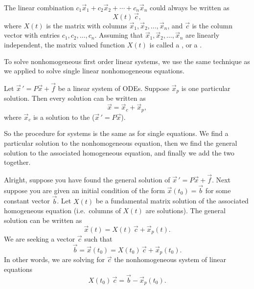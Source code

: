 \documentclass[12pt]{book}
\begin{document}
The linear combination $c_1 \vec{x}_1 + c_2 \vec{x}_2 + \cdots + c_n
\vec{x}_n$ could always be written as
\begin{equation*}
X(t)\,\vec{c} ,
\end{equation*}
where $X(t)$ is the matrix with columns $\vec{x}_1, \vec{x}_2, \ldots, \vec{x}_n$,
and $\vec{c}$ is the column vector with entries $c_1, c_2, \ldots, c_n$.
Assuming that $\vec{x}_1,\vec{x}_2,\ldots,\vec{x}_n$ are linearly
independent,
the matrix valued function $X(t)$ is called a \emph{},
or a \emph{}.

\medskip

To solve nonhomogeneous first order linear systems, we use the same
technique as we applied to solve single linear nonhomogeneous equations.

\begin{theorem}
Let
${\vec{x}\,}' = P\vec{x} + \vec{f}$ be a linear system of ODEs.
Suppose $\vec{x}_p$ is one particular solution.  Then every solution
can be written as
\begin{equation*}
\vec{x} = \vec{x}_c + \vec{x}_p ,
\end{equation*}
where $\vec{x}_c$ is a solution to the
(${\vec{x}\,}' = P\vec{x}$).
\end{theorem}

So the procedure for systems is the same as for single equations.
We find a particular solution
to the nonhomogeneous equation, then we find the general solution to the
associated homogeneous equation, and finally we add the two together.

\medskip

Alright, suppose you have found the general solution of
${\vec{x}\,}' = P\vec{x} + \vec{f}$.  Next suppose you are given an
initial condition of the form $\vec{x}(t_0) = \vec{b}$ for some constant
vector $\vec{b}$.  Let $X(t)$ be a fundamental matrix solution
of the associated homogeneous equation
(i.e.\ columns of $X(t)$ are solutions).  The general solution can be
written as
\begin{equation*}
\vec{x}(t) = X(t)\,\vec{c} + \vec{x}_p(t).
\end{equation*}
We are seeking a vector 
$\vec{c}$ such that
\begin{equation*}
\vec{b} = \vec{x}(t_0) = X(t_0)\,\vec{c} + \vec{x}_p(t_0).
\end{equation*}
In other words, we are solving for $\vec{c}$ the nonhomogeneous system of linear equations
\begin{equation*}
X(t_0)\,\vec{c} = \vec{b} - \vec{x}_p(t_0) .
\end{equation*}
\end{document}
